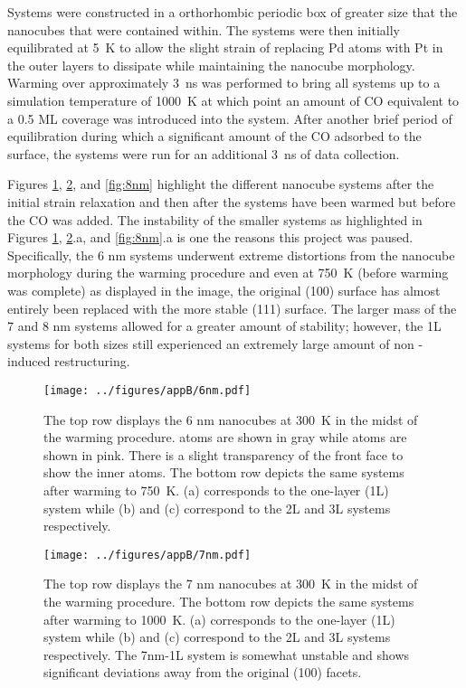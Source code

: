 Systems were constructed in a orthorhombic periodic box of greater size that
the nanocubes that were contained within. The systems were then initially
equilibrated at 5~K to allow the slight strain of replacing Pd atoms with Pt in
the outer layers to dissipate while maintaining the nanocube morphology.
Warming over approximately 3~ns was performed to bring all systems up to a
simulation temperature of 1000~K at which point an amount of CO equivalent to a
0.5 ML coverage was introduced into the system.  After another brief period of
equilibration during which a significant amount of the CO adsorbed to the
surface, the systems were run for an additional 3~ns of
data collection.

Figures \ref{fig:6nm}, \ref{fig:7nm}, and \ref{fig:8nm} highlight the different
nanocube systems after the initial strain relaxation and then after the systems
have been warmed but before the CO was added. The instability of the smaller
systems as highlighted in Figures \ref{fig:6nm}, \ref{fig:7nm}.a, and
\ref{fig:8nm}.a is one the reasons this project was paused.  Specifically, the
6 nm systems underwent extreme distortions from the nanocube morphology during
the warming procedure and even at 750~K (before warming was complete) as
displayed in the image, the original (100) surface has almost entirely been
replaced with the more stable (111) surface. The larger mass of the 7 and 8 nm
systems allowed for a greater amount of stability; however, the 1L systems for
both sizes still experienced an extremely large amount of non -induced
restructuring.

\begin{landscape}
\begin{figure}[p!]
\centering
  \texttt{[image: ../figures/appB/6nm.pdf]}
  \caption{The top row displays the 6 nm nanocubes at 300~K in the midst of the
warming procedure.   atoms are shown in gray while  atoms are
shown in pink.  There is a slight transparency of the front  face to
show the inner  atoms. The bottom row depicts the same systems after
warming to 750~K.  (a) corresponds to the one-layer (1L) system while (b) and
(c) correspond to the 2L and 3L systems respectively.}
  \label{fig:6nm}
\end{figure}
\end{landscape}

\begin{landscape}
\begin{figure}[p!]
\centering
  \texttt{[image: ../figures/appB/7nm.pdf]}
  \caption{The top row displays the 7 nm nanocubes at 300~K in the midst of the warming procedure.
The bottom row depicts the same systems after warming to
1000~K.  (a) corresponds to the one-layer (1L) system while (b) and (c)
correspond to the 2L and 3L systems respectively. The 7nm-1L system is somewhat
unstable and shows significant deviations away from the original (100) facets.}
  \label{fig:7nm}
\end{figure}
\end{landscape}

